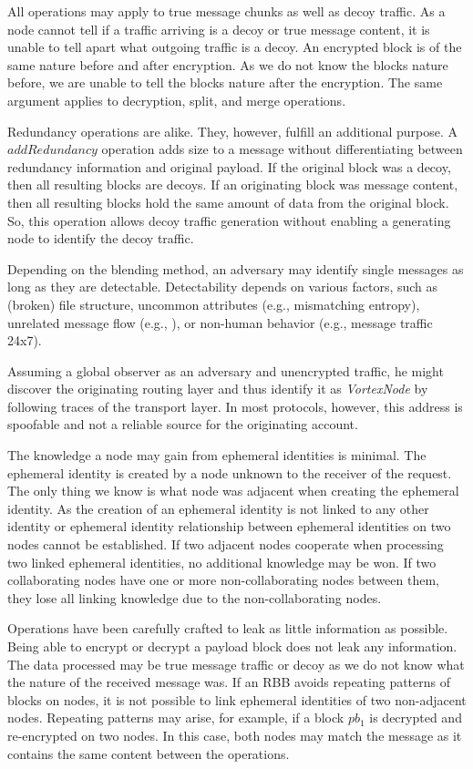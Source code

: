 \documentclass[acmsmall, screen, review]{acmart}
\begin{document}
	All operations may apply to true message chunks as well as decoy traffic. As a node cannot tell if a traffic arriving is a decoy or true message content, it is unable to tell apart what outgoing traffic is a decoy. An encrypted block is of the same nature before and after encryption. As we do not know the blocks nature before, we are unable to tell the blocks nature after the encryption. The same argument applies to decryption, split, and merge operations. 
	
	Redundancy operations are alike. They, however, fulfill an additional purpose. A $addRedundancy$ operation adds size to a message without differentiating between redundancy information and original payload. If the original block was a decoy, then all resulting blocks are decoys. If an originating block was message content, then all resulting blocks hold the same amount of data from the original block. So, this operation allows decoy traffic generation without enabling a generating node to identify the decoy traffic.
	
	Depending on the blending method, an adversary may identify single messages as long as they are detectable. Detectability depends on various factors, such as (broken) file structure, uncommon attributes (e.g., mismatching entropy), unrelated message flow (e.g., \cite{oakland2013-parrot}), or non-human behavior (e.g., message traffic 24x7).
	
	Assuming a global observer as an adversary and unencrypted traffic, he might discover the originating routing layer and thus identify it as \emph{VortexNode} by following traces of the transport layer. In most protocols, however, this address is spoofable and not a reliable source for the originating account.
	
	The knowledge a node may gain from ephemeral identities is minimal. The ephemeral identity is created by a node unknown to the receiver of the request. The only thing we know is what node was adjacent when creating the ephemeral identity. As the creation of an ephemeral identity is not linked to any other identity or ephemeral identity relationship between ephemeral identities on two nodes cannot be established. If two adjacent nodes cooperate when processing two linked ephemeral identities, no additional knowledge may be won. If two collaborating nodes have one or more non-collaborating nodes between them, they lose all linking knowledge due to the non-collaborating nodes. 
	
	Operations have been carefully crafted to leak as little information as possible. Being able to encrypt or decrypt a payload block does not leak any information. The data processed may be true message traffic or decoy as we do not know what the nature of the received message was. If an RBB avoids repeating patterns of blocks on nodes, it is not possible to link ephemeral identities of two non-adjacent nodes. Repeating patterns may arise, for example, if a block $pb_1$ is decrypted and re-encrypted on two nodes. In this case, both nodes may match the message as it contains the same content between the operations.
	
\end{document}
